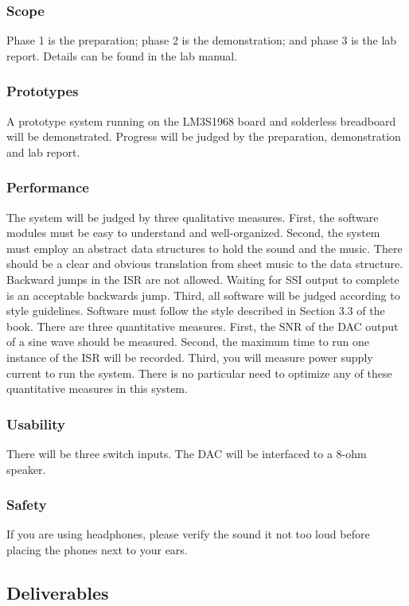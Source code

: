 \documentclass[twoside]{article}
\begin{document}
\subsubsection*{Scope} 
Phase 1 is the preparation; phase 2 is the demonstration; and phase 3 is the lab report. Details can be found in the lab manual. 
 
\subsubsection*{Prototypes}
A prototype system running on the LM3S1968 board and solderless breadboard will be demonstrated. Progress will be judged by the preparation, demonstration and lab report. 
 
\subsubsection*{Performance} 
The system will be judged by three qualitative measures. First, the software modules must be easy to understand and well-organized. Second, the system must employ an abstract data structures to hold the sound and the music. There should be a clear and obvious translation from sheet music to the data structure. Backward jumps in the ISR are not allowed. Waiting for SSI output to complete is an acceptable backwards jump. Third, all software will be judged according to style guidelines. Software must follow the style described in Section 3.3 of the book. There are three quantitative measures. First, the SNR of the DAC output of a sine wave should be measured. Second, the maximum time to run one instance of the ISR will be recorded. Third, you will measure power supply current to run the system. There is no particular need to optimize any of these quantitative measures in this system.

\subsubsection*{Usability} 
There will be three switch inputs. The DAC will be interfaced to a 8-ohm speaker. 

\subsubsection*{Safety} 
 If you are using headphones, please verify the sound it not too loud before placing the phones next to your ears. 
 
\subsection*{Deliverables} 
\end{document}
